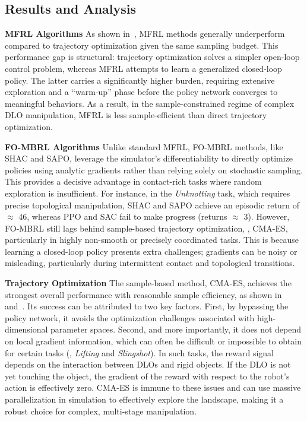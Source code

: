\subsection{Results and Analysis}

\textbf{MFRL Algorithms}
As shown in~, MFRL methods generally underperform compared to trajectory optimization given the same sampling budget. This performance gap is structural: trajectory optimization solves a simpler open-loop control problem, whereas MFRL attempts to learn a generalized closed-loop policy. The latter carries a significantly higher burden, requiring extensive exploration and a ``warm-up'' phase before the policy network converges to meaningful behaviors. As a result, in the sample-constrained regime of complex DLO manipulation, MFRL is less sample-efficient than direct trajectory optimization.

\textbf{FO-MBRL Algorithms}
Unlike standard MFRL, FO-MBRL methods, like SHAC and SAPO, leverage the simulator's differentiability to directly optimize policies using analytic gradients rather than relying solely on stochastic sampling. This provides a decisive advantage in contact-rich tasks where random exploration is insufficient. For instance, in the \textit{Unknotting} task, which requires precise topological manipulation, SHAC and SAPO achieve an episodic return of $\approx$ 46, whereas PPO and SAC fail to make progress (returns $\approx$ 3). However, FO-MBRL still lags behind sample-based trajectory optimization, \ie, CMA-ES, particularly in highly non-smooth or precisely coordinated tasks. This is because learning a closed-loop policy presents extra challenges; gradients can be noisy or misleading, particularly during intermittent contact and topological transitions.

\textbf{Trajectory Optimization}
The sample-based method, CMA-ES, achieves the strongest overall performance with reasonable sample efficiency, as shown in~ and~. Its success can be attributed to two key factors. First, by bypassing the policy network, it avoids the optimization challenges associated with high-dimensional parameter spaces. Second, and more importantly, it does not depend on local gradient information, which can often be difficult or impossible to obtain for certain tasks (\eg, \textit{Lifting} and \textit{Slingshot}). In such tasks, the reward signal depends on the interaction between DLOs and rigid objects. If the DLO is not yet touching the object, the gradient of the reward with respect to the robot's action is effectively zero. CMA-ES is immune to these issues and can use massive parallelization in simulation to effectively explore the landscape, making it a robust choice for complex, multi-stage manipulation.

